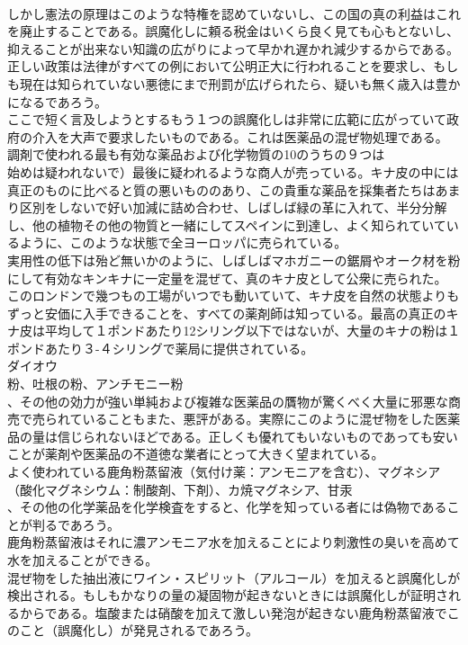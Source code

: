 \documentclass[8pt]{extreport}
\begin{document}
\begin{CJK}{UTF8}{min}
\\	しかし憲法の原理はこのような特権を認めていないし、この国の真の利益はこれを廃止することである。誤魔化しに頼る税金はいくら良く見ても心もとないし、抑えることが出来ない知識の広がりによって早かれ遅かれ減少するからである。正しい政策は法律がすべての例において公明正大に行われることを要求し、もしも現在は知られていない悪徳にまで刑罰が広げられたら、疑いも無く歳入は豊かになるであろう。
\\	ここで短く言及しようとするもう１つの誤魔化しは非常に広範に広がっていて政府の介入を大声で要求したいものである。これは医薬品の混ぜ物処理である。
\\	調剤で使われる最も有効な薬品および化学物質の10のうちの９つは
\\	始めは疑われないで）最後に疑われるような商人が売っている。キナ皮の中には真正のものに比べると質の悪いもののあり、この貴重な薬品を採集者たちはあまり区別をしないで好い加減に詰め合わせ、しばしば緑の革に入れて、半分分解し、他の植物その他の物質と一緒にしてスペインに到達し、よく知られていているように、このような状態で全ヨーロッパに売られている。
\\	実用性の低下は殆ど無いかのように、しばしばマホガニーの鋸屑やオーク材を粉にして有効なキンキナに一定量を混ぜて、真のキナ皮として公衆に売られた。
\\	このロンドンで幾つもの工場がいつでも動いていて、キナ皮を自然の状態よりもずっと安価に入手できることを、すべての薬剤師は知っている。最高の真正のキナ皮は平均して１ポンドあたり12シリング以下ではないが、大量のキナの粉は１ポンドあたり３-４シリングで薬局に提供されている。
\\	ダイオウ
\\	粉、吐根の粉、アンチモニー粉
\\	、その他の効力が強い単純および複雑な医薬品の贋物が驚くべく大量に邪悪な商売で売られていることもまた、悪評がある。実際にこのように混ぜ物をした医薬品の量は信じられないほどである。正しくも優れてもいないものであっても安いことが薬剤や医薬品の不道徳な業者にとって大きく望まれている。
\\	よく使われている鹿角粉蒸留液（気付け薬：アンモニアを含む）、マグネシア（酸化マグネシウム：制酸剤、下剤）、カ焼マグネシア、甘汞
\\	、その他の化学薬品を化学検査をすると、化学を知っている者には偽物であることが判るであろう。
\\	鹿角粉蒸留液はそれに濃アンモニア水を加えることにより刺激性の臭いを高めて水を加えることができる。
\\	混ぜ物をした抽出液にワイン・スピリット（アルコール）を加えると誤魔化しが検出される。もしもかなりの量の凝固物が起きないときには誤魔化しが証明されるからである。塩酸または硝酸を加えて激しい発泡が起きない鹿角粉蒸留液でこのこと（誤魔化し）が発見されるであろう。

\end{CJK}
\end{document}
